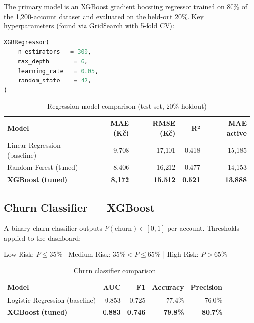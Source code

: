 \documentclass[11pt,a4paper]{article}
\begin{document}
The primary model is an XGBoost gradient boosting regressor trained on
80\% of the 1{,}200-account dataset and evaluated on the held-out 20\%.
Key hyperparameters (found via GridSearch with 5-fold CV):

\begin{lstlisting}[language=Python]
XGBRegressor(
    n_estimators   = 300,
    max_depth       = 6,
    learning_rate   = 0.05,
    random_state    = 42,
)
\end{lstlisting}

\begin{table}[H]
\centering\small
\begin{tabular}{lrrrr}
\toprule
\textbf{Model} & \textbf{MAE (Kč)} & \textbf{RMSE (Kč)} & \textbf{R²} & \textbf{MAE active} \\
\midrule
Linear Regression (baseline) & 9{,}708 & 17{,}101 & 0.418 & 15{,}185 \\
Random Forest (tuned)        & 8{,}406 & 16{,}212 & 0.477 & 14{,}153 \\
\textbf{XGBoost (tuned)}     & \textbf{8{,}172} & \textbf{15{,}512} & \textbf{0.521} & \textbf{13{,}888} \\
\bottomrule
\end{tabular}
\caption{Regression model comparison (test set, 20\% holdout)}
\end{table}

\subsection{Churn Classifier — XGBoost}

A binary churn classifier outputs $P(\text{churn}) \in [0,1]$ per account.
Thresholds applied to the dashboard:

\begin{center}
  Low Risk: $P \leq 35\%$ \quad|\quad
  Medium Risk: $35\% < P \leq 65\%$ \quad|\quad
  High Risk: $P > 65\%$
\end{center}

\begin{table}[H]
\centering\small
\begin{tabular}{lrrrr}
\toprule
\textbf{Model} & \textbf{AUC} & \textbf{F1} & \textbf{Accuracy} & \textbf{Precision} \\
\midrule
Logistic Regression (baseline) & 0.853 & 0.725 & 77.4\% & 76.0\% \\
\textbf{XGBoost (tuned)}       & \textbf{0.883} & \textbf{0.746} & \textbf{79.8\%} & \textbf{80.7\%} \\
\bottomrule
\end{tabular}
\caption{Churn classifier comparison}
\end{table}
\end{document}
